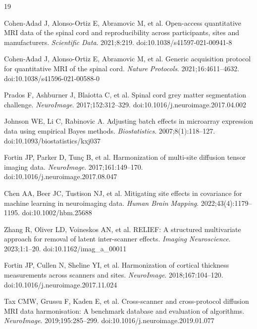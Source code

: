 \documentclass[12pt,a4paper]{article}
\begin{document}
\begin{thebibliography}{19}

Cohen-Adad J, Alonso-Ortiz E, Abramovic M, et al.
Open-access quantitative MRI data of the spinal cord and reproducibility across participants, sites and manufacturers.
\textit{Scientific Data}. 2021;8:219. doi:10.1038/s41597-021-00941-8

Cohen-Adad J, Alonso-Ortiz E, Abramovic M, et al.
Generic acquisition protocol for quantitative MRI of the spinal cord.
\textit{Nature Protocols}. 2021;16:4611--4632. doi:10.1038/s41596-021-00588-0

Prados F, Ashburner J, Blaiotta C, et al.
Spinal cord grey matter segmentation challenge.
\textit{NeuroImage}. 2017;152:312--329. doi:10.1016/j.neuroimage.2017.04.002

Johnson WE, Li C, Rabinovic A.
Adjusting batch effects in microarray expression data using empirical Bayes methods.
\textit{Biostatistics}. 2007;8(1):118--127. doi:10.1093/biostatistics/kxj037

Fortin JP, Parker D, Tun\c{c} B, et al.
Harmonization of multi-site diffusion tensor imaging data.
\textit{NeuroImage}. 2017;161:149--170. doi:10.1016/j.neuroimage.2017.08.047

Chen AA, Beer JC, Tustison NJ, et al.
Mitigating site effects in covariance for machine learning in neuroimaging data.
\textit{Human Brain Mapping}. 2022;43(4):1179--1195. doi:10.1002/hbm.25688

Zhang R, Oliver LD, Voineskos AN, et al.
RELIEF: A structured multivariate approach for removal of latent inter-scanner effects.
\textit{Imaging Neuroscience}. 2023;1:1--20. doi:10.1162/imag\_a\_00011

Fortin JP, Cullen N, Sheline YI, et al.
Harmonization of cortical thickness measurements across scanners and sites.
\textit{NeuroImage}. 2018;167:104--120. doi:10.1016/j.neuroimage.2017.11.024

Tax CMW, Grussu F, Kaden E, et al.
Cross-scanner and cross-protocol diffusion MRI data harmonisation: A benchmark database and evaluation of algorithms.
\textit{NeuroImage}. 2019;195:285--299. doi:10.1016/j.neuroimage.2019.01.077


\end{thebibliography}
\end{document}
